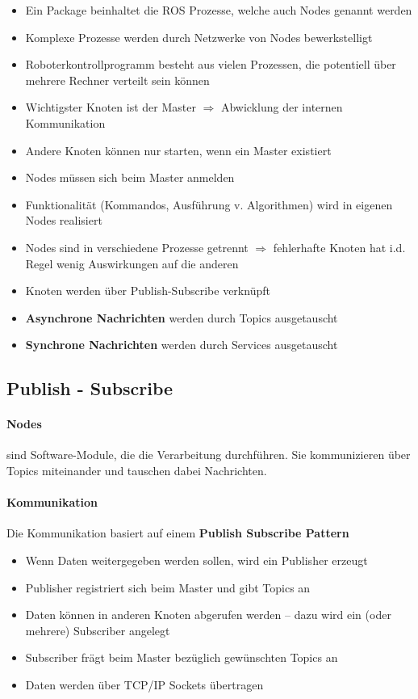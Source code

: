 \begin{itemize}
	\item Ein Package beinhaltet die ROS Prozesse, welche auch Nodes genannt werden
	\item Komplexe Prozesse werden durch Netzwerke von Nodes bewerkstelligt
	\item Roboterkontrollprogramm besteht aus vielen Prozessen, die potentiell über mehrere Rechner verteilt sein können
	\item Wichtigster Knoten ist der Master $\Rightarrow$ Abwicklung der internen Kommunikation
	\item Andere Knoten können nur starten, wenn ein Master existiert
	\item Nodes müssen sich beim Master anmelden
	\item Funktionalität (Kommandos, Ausführung v. Algorithmen) wird in eigenen Nodes realisiert
	\item Nodes sind in verschiedene Prozesse getrennt $\Rightarrow$ fehlerhafte Knoten hat i.d. Regel wenig Auswirkungen auf die anderen
	\item Knoten werden über Publish-Subscribe verknüpft
	\item \textbf{Asynchrone Nachrichten} werden durch Topics ausgetauscht
	\item \textbf{Synchrone Nachrichten} werden durch Services ausgetauscht
\end{itemize}
\subsection{Publish - Subscribe}
\paragraph{Nodes} sind Software-Module, die die Verarbeitung durchführen. Sie kommunizieren über Topics miteinander und tauschen dabei Nachrichten.
\paragraph{Kommunikation}
Die Kommunikation basiert auf einem \textbf{Publish Subscribe Pattern}
\begin{itemize}
	\item Wenn Daten weitergegeben werden sollen, wird ein Publisher erzeugt
	\item Publisher registriert sich beim Master und gibt Topics an
	\item Daten können in anderen Knoten abgerufen werden -- dazu wird ein (oder mehrere) Subscriber angelegt
	\item Subscriber frägt beim Master bezüglich gewünschten Topics an
	\item Daten werden über TCP/IP Sockets übertragen
\end{itemize}
